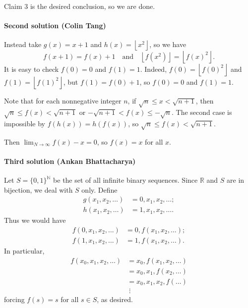 Claim 3 is the desired conclusion, so we are done.

\paragraph{Second solution (Colin Tang)}     Instead take $g(x)=x+1$ and $h(x)=\left\lfloor x^2\right\rfloor$, so we have \[f(x+1)=f(x)+1\quad\text{and}\quad \left\lfloor f\left(x^2\right)\right\rfloor=\left\lfloor f(x)^2\right\rfloor.\]
It is easy to check $f(0)=0$ and $f(1)=1$. Indeed, $f(0)=\left\lfloor f(0)^2\right\rfloor$ and $f(1)=\left\lfloor f(1)^2\right\rfloor$, but $f(1)=f(0)+1$, so $f(0)=0$ and $f(1)=1$.

Note that for each nonnegative integer $n$, if $\sqrt n\le x<\sqrt{n+1}$, then $\sqrt n\le f(x)<\sqrt{n+1}$ or $-\sqrt{n+1}<f(x)\le-\sqrt n$. The second case is impossible by $f(h(x))=h(f(x))$, so $\sqrt n\le f(x)<\sqrt{n+1}$.

Then $\lim_{N\to\infty}f(x)-x=0$, so $f(x)=x$ for all $x$.

\paragraph{Third solution (Ankan Bhattacharya)}     Let $S=\{0,1\}^{\mathbb N}$ be the set of all infinite binary sequences. Since $\mathbb R$ and $S$ are in bijection, we deal with $S$ only. Define
\begin{align*}
    g(x_1,x_2,\ldots)&=0,x_1,x_2,\ldots;\\
    h(x_1,x_2,\ldots)&=1,x_1,x_2,\ldots.
\end{align*}
Thus we would have
\begin{align*}
    f(0,x_1,x_2,\ldots)&=0,f(x_1,x_2,\ldots);\\
    f(1,x_1,x_2,\ldots)&=1,f(x_1,x_2,\ldots).
\end{align*}
In particular,
\begin{align*}
    f(x_0,x_1,x_2,\ldots)&=x_0,f(x_1,x_2,\ldots)\\
    &=x_0,x_1,f(x_2,\ldots)\\
    &=x_0,x_1,x_2,f(\ldots)\\
    &\;\vdots
\end{align*}
forcing $f(s)=s$ for all $s\in S$, as desired.

